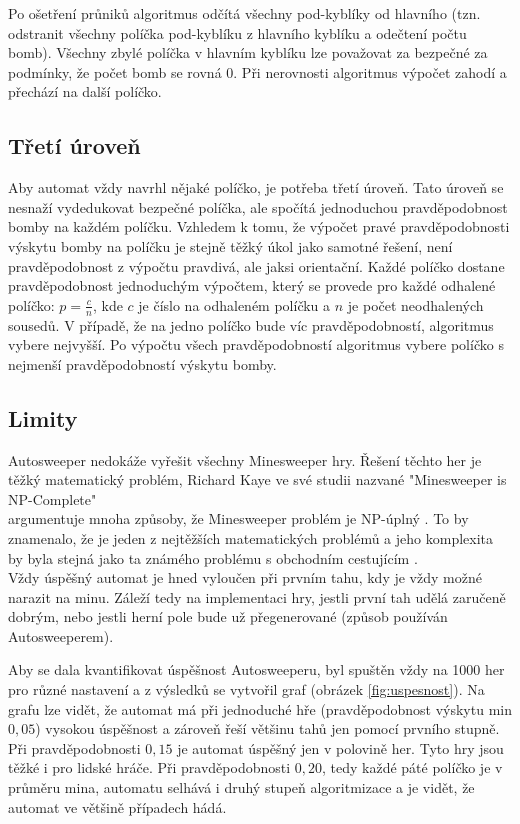 Po ošetření průniků algoritmus odčítá všechny pod-kyblíky od hlavního (tzn. odstranit všechny políčka pod-kyblíku z hlavního
kyblíku a odečtení počtu bomb). Všechny zbylé políčka v hlavním kyblíku lze považovat za bezpečné za podmínky, že počet bomb se
rovná $0$. Při nerovnosti algoritmus výpočet zahodí a přechází na další políčko.


\subsection{Třetí úroveň}
Aby automat vždy navrhl nějaké políčko, je potřeba třetí úroveň. Tato úroveň se nesnaží vydedukovat bezpečné políčka, ale spočítá
jednoduchou pravděpodobnost bomby na každém políčku. Vzhledem k tomu, že výpočet pravé pravděpodobnosti výskytu bomby na políčku
je stejně těžký úkol jako samotné řešení, není pravděpodobnost z výpočtu pravdivá, ale jaksi orientační. Každé políčko dostane
pravděpodobnost jednoduchým výpočtem, který se provede pro každé odhalené políčko: $p = \frac{c}{n}$, kde $c$ je číslo na
odhaleném políčku a $n$ je počet neodhalených sousedů. V případě, že na jedno políčko bude víc pravděpodobností, algoritmus vybere
nejvyšší. Po výpočtu všech pravděpodobností algoritmus vybere políčko s nejmenší pravděpodobností výskytu bomby.


\subsection{Limity}
Autosweeper nedokáže vyřešit všechny Minesweeper hry. Řešení těchto her je těžký matematický problém, Richard Kaye ve své studii
nazvané "Minesweeper is NP-Complete" \\argumentuje mnoha způsoby, že Minesweeper problém je NP-úplný \cite{Kaye2000}. To by
znamenalo, že je jeden z nejtěžších matematických problémů a jeho komplexita by byla stejná jako ta známého problému s obchodním
cestujícím \cite{wiki_tsp}. \\Vždy úspěšný automat je hned vyloučen při prvním tahu, kdy je vždy možné narazit na minu. Záleží
tedy na implementaci hry, jestli první tah udělá zaručeně dobrým, nebo jestli herní pole bude už přegenerované (způsob používán
Autosweeperem).

Aby se dala kvantifikovat úspěšnost Autosweeperu, byl spuštěn vždy na 1000 her pro různé nastavení a z výsledků se vytvořil graf
(obrázek \ref{fig:uspesnost}). Na grafu lze vidět, že automat má při jednoduché hře (pravděpodobnost výskytu min $0,05$) vysokou
úspěšnost a zároveň řeší většinu tahů jen pomocí prvního stupně. Při pravděpodobnosti $0,15$ je automat úspěšný jen v polovině
her. Tyto hry jsou těžké i pro lidské hráče. Při pravděpodobnosti $0,20$, tedy každé páté políčko je v průměru mina, automatu
selhává i druhý stupeň algoritmizace a je vidět, že automat ve většině případech hádá.


